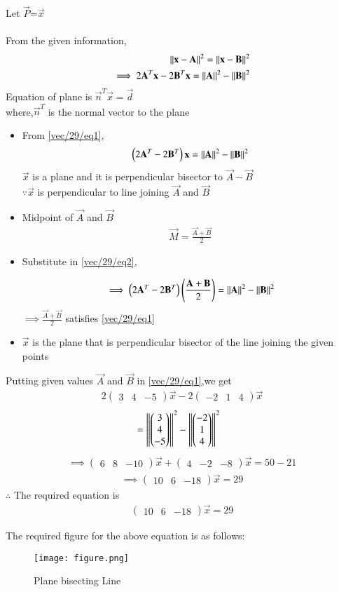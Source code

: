 \documentclass[journal,12pt,twocolumn]{IEEEtran}
\newcommand{\myvec}[1]{\ensuremath{\begin{pmatrix}#1\end{pmatrix}}}
\begin{document}
 Let $\vec{P}$=$\vec{x}$\\ 
 \\
 From the given information,
\begin{align}
\left\lVert\mathbf{x}-\mathbf{A}\right\rVert^2=\left\lVert\mathbf{x}-\mathbf{B}\right\rVert^2
\\
\implies 2\mathbf{A}^T\mathbf{x}-2\mathbf{B}^T\mathbf{x}=\left\lVert\mathbf{A}\right\rVert^2-\left\lVert\mathbf{B}\right\rVert^2  \label{vec/29/eq1}
\end{align}
 Equation of plane is $\vec{n}^T\vec{x}=\vec{d}$
\\
where,$\vec{n}^T$ is the normal vector to the plane \\
\begin{itemize}
\item From \eqref{vec/29/eq1},
\begin{align}
\myvec{2\vec{A}^T-2\vec{B}^T}\vec{x}=\norm{\vec{A}}^2-\norm{\vec{B}}^2 \label{vec/29/eq2}
\end{align}
$\vec{x}$ is a plane and it is perpendicular bisector to $\vec{A}-\vec{B}$
\\
$\because\vec{x}$ is perpendicular to line joining $\vec{A}$ and $\vec{B}$
\item Midpoint of $\vec{A}$ and $\vec{B}$
\begin{align}
\vec{M}= \frac{\vec{A}+\vec{B}}{2}
\end{align}
\item Substitute in \eqref{vec/29/eq2},

\begin{align}
\implies\myvec{2\vec{A}^T-2\vec{B}^T}\brak{\frac{\vec{A}+\vec{B}}{2}}=\norm{\vec{A}}^2-\norm{\vec{B}}^2 
\end{align}
$\implies \frac{\vec{A}+\vec{B}}{2}$ satisfies \eqref{vec/29/eq1}\\
\item $\vec{x}$ is the plane that is perpendicular bisector of the line joining the given points \\
\end{itemize}
 Putting given values $\vec{A}$ and $\vec{B}$ in \eqref{vec/29/eq1},we get 
\begin{align}
2\myvec{3 & 4 & -5}\vec{x}-2\myvec{-2 & 1 & 4}\vec{x}
\end{align}
\begin{align}
    & = \norm{\myvec{3\\4\\-5}}^2 - \norm{\myvec{-2\\1\\4}}^2
\end{align}
\begin{align}
 \implies\myvec{6 & 8 & -10}\vec{x}+\myvec{4 & -2 & -8}\vec{x} =50-21   
\end{align}
\begin{align}
\implies\myvec{10 & 6 & -18}\vec{x}=29
\end{align}
$\therefore$ The required equation is
\begin{align}
\myvec{10 & 6 & -18}\vec{x}=29
\end{align}

 The required figure for the above equation is as follows:
\begin{figure}[!ht]
    \centering
    \texttt{[image: figure.png]}
    \caption{Plane bisecting Line}
    \label{quadform/73/b/fig:Plane bisecting Line}
\end{figure} 
\end{document}
